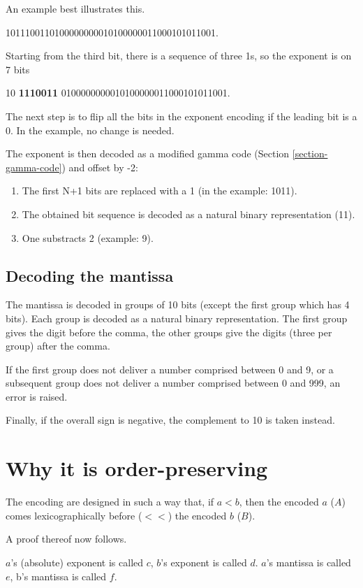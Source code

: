 \documentclass{acm_proc_article-sp}
\begin{document}
An example best illustrates this.

1011100110100000000010100000011000101011001.

Starting from the third bit, there is a sequence of three 1s, so the exponent is on 7 bits

10 \textbf{1110011} 0100000000010100000011000101011001.

The next step is to flip all the bits in the exponent encoding if the leading bit is a 0. In the example, no change is needed.

The exponent is then decoded as a modified gamma code (Section \ref{section-gamma-code}) and offset by -2:

\begin{enumerate}
\item The first N+1 bits are replaced with a 1 (in the example: 1011).
\item The obtained bit sequence is decoded as a natural binary representation (11).
\item One substracts 2 (example: 9).
\end{enumerate}

\subsection{Decoding the mantissa}

The mantissa is decoded in groups of 10 bits (except the first group which has 4 bits). Each group is decoded as a natural binary representation. The first group gives the digit before the comma, the other groups give the digits (three per group) after the comma.

If the first group does not deliver a number comprised between 0 and 9, or a subsequent group does not deliver a number comprised between 0 and 999, an error is raised.

Finally, if the overall sign is negative, the complement to 10 is taken instead.

\section{Why it is order-preserving}
\label{section-proof}

The encoding are designed in such a way that, if $a < b$, then the encoded $a$ ($A$) comes lexicographically before ($<<$) the encoded $b$ ($B$).

A proof thereof now follows.

$a$'s (absolute) exponent is called $c$, $b$'s exponent is called $d$. $a$'s mantissa is called $e$, b's mantissa is called $f$.
 
\end{document}
